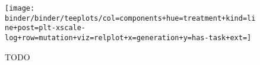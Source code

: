 \begin{figure}
    \centering
    \texttt{[image: binder/binder/teeplots/col=components+hue=treatment+kind=line+post=plt-xscale-log+row=mutation+viz=relplot+x=generation+y=has-task+ext=]}
    \caption{TODO} \label{fig:adaptive-evolution-rate}
\end{figure}

